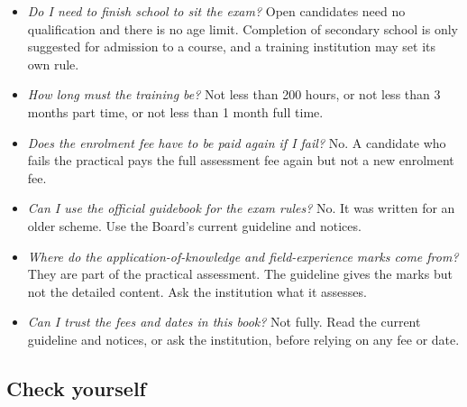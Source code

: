 \begin{itemize}
\item \emph{Do I need to finish school to sit the exam?} Open candidates need no qualification and there is no age limit. Completion of secondary school is only suggested for admission to a course, and a training institution may set its own rule.
\item \emph{How long must the training be?} Not less than 200 hours, or not less than 3 months part time, or not less than 1 month full time.
\item \emph{Does the enrolment fee have to be paid again if I fail?} No. A candidate who fails the practical pays the full assessment fee again but not a new enrolment fee.
\item \emph{Can I use the official guidebook for the exam rules?} No. It was written for an older scheme. Use the Board's current guideline and notices.
\item \emph{Where do the application-of-knowledge and field-experience marks come from?} They are part of the practical assessment. The guideline gives the marks but not the detailed content. Ask the institution what it assesses.
\item \emph{Can I trust the fees and dates in this book?} Not fully. Read the current guideline and notices, or ask the institution, before relying on any fee or date.
\end{itemize}

\subsection*{Check yourself}

